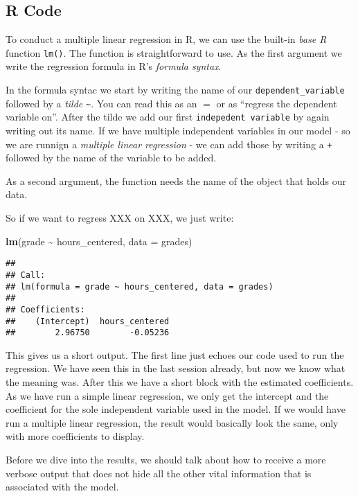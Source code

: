 \documentclass[
]{book}
\newenvironment{Shaded}{\begin{snugshade}}{\end{snugshade}}
\newcommand{\AttributeTok}[1]{\textcolor[rgb]{0.13,0.29,0.53}{#1}}
\newcommand{\FunctionTok}[1]{\textcolor[rgb]{0.13,0.29,0.53}{\textbf{#1}}}
\newcommand{\NormalTok}[1]{#1}
\newcommand{\SpecialCharTok}[1]{\textcolor[rgb]{0.81,0.36,0.00}{\textbf{#1}}}
\begin{document}
\hypertarget{r-code}{%
\subsection{R Code}\label{r-code}}

To conduct a multiple linear regression in R, we can use the built-in \emph{base R}
function \texttt{lm()}. The function is straightforward to use. As the first argument
we write the regression formula in R's \emph{formula syntax}.

In the formula syntac we start by writing the name of our \texttt{dependent\_variable}
followed by a \emph{tilde} \texttt{\textasciitilde{}}. You can read this as an \(=\) or as ``regress the
dependent variable on''. After the tilde we add our first \texttt{indepedent\ variable}
by again writing out its name. If we have multiple independent variables in our
model - so we are runnign a \emph{multiple linear regression} - we can add those by
writing a \texttt{+} followed by the name of the variable to be added.

As a second argument, the function needs the name of the object that holds our
data.

So if we want to regress XXX on XXX, we just write:

\begin{Shaded}
\begin{Highlighting}[]
\FunctionTok{lm}\NormalTok{(grade }\SpecialCharTok{\textasciitilde{}}\NormalTok{ hours\_centered, }\AttributeTok{data =}\NormalTok{ grades)}
\end{Highlighting}
\end{Shaded}

\begin{verbatim}
## 
## Call:
## lm(formula = grade ~ hours_centered, data = grades)
## 
## Coefficients:
##    (Intercept)  hours_centered  
##        2.96750        -0.05236
\end{verbatim}

This gives us a short output. The first line just echoes our code used to run
the regression. We have seen this in the last session already, but now we know
what the meaning was. After this we have a short block with the estimated
coefficients. As we have run a simple linear regression, we only get the
intercept and the coefficient for the sole independent variable used in the
model. If we would have run a multiple linear regression, the result would
basically look the same, only with more coefficients to display.

Before we dive into the results, we should talk about how to receive a more
verbose output that does not hide all the other vital information that is
associated with the model.
\end{document}
